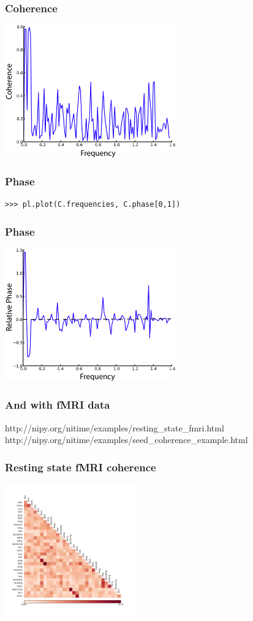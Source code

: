 \documentclass{beamer}
\begin{document}
\begin{frame}
\frametitle{Coherence}
\includegraphics[height=5.7cm]{figures/outa_phase_tseries_coh}
\end{frame}

\begin{frame}[fragile]
\frametitle{Phase}
\begin{lstlisting}
>>> pl.plot(C.frequencies, C.phase[0,1])
\end{lstlisting}
\end{frame}

\begin{frame}
\frametitle{Phase}
\includegraphics[height=5.7cm]{figures/outa_phase_tseries_ph}
\end{frame}

\begin{frame}
\frametitle{And with fMRI data}
\small{http://nipy.org/nitime/examples/resting\_state\_fmri.html}
\small{http://nipy.org/nitime/examples/seed\_coherence\_example.html}
\end{frame}

\begin{frame}
\frametitle{Resting state fMRI coherence}
\includegraphics[height=5.7cm]{figures/resting_state_fmri_03}
\end{frame}
\end{document}
